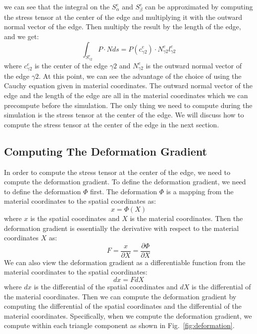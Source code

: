 \documentclass[acmtog]{acmart}
\begin{document}
we can see that the integral on the $S_{\alpha}^e$ and $S_{\beta}^e$ can be approximated by computing the stress tensor at the center of the edge and multiplying it with the outward normal vector of the edge. Then multiply the result by the length of the edge, and we get:
\begin{equation*}
  \int_{S_{\gamma2}^e} P \cdot N ds = P(c_{\gamma2}^e) \cdot N_{\gamma2}^e l_{\gamma2}^e
\end{equation*}
where $c_{\gamma2}^e$ is the center of the edge $\gamma2$ and $N_{\gamma2}^e$ is the outward normal vector of the edge $\gamma2$. At this point, we can see the advantage of the choice of using the Cauchy equation given in material coordinates. The outward normal vector of the edge and the length of the edge are all in the material coordinates which we can precompute before the simulation. The only thing we need to compute during the simulation is the stress tensor at the center of the edge. We will discuss how to compute the stress tensor at the center of the edge in the next section. 

\subsection{Computing The Deformation Gradient}
In order to compute the stress tensor at the center of the edge, we need to compute the deformation gradient. To define the deformation gradient, we need to define the deformation $\Phi$ first. The deformation $\Phi$ is a mapping from the material coordinates to the spatial coordinates as:
\begin{equation*}
  x = \Phi(X)
\end{equation*}
where $x$ is the spatial coordinates and $X$ is the material coordinates. Then the deformation gradient is essentially the derivative with respect to the material coordinates $X$ as:
\begin{equation*}
  F = \frac{x}{\partial X}=\frac{\partial \Phi}{\partial X}
\end{equation*}
We can also view the deformation gradient as a differentiable function from the material coordinates to the spatial coordinates: 
\begin{equation*}
  dx = F dX
\end{equation*}
where $dx$ is the differential of the spatial coordinates and $dX$ is the differential of the material coordinates. Then we can compute the deformation gradient by computing the differential of the spatial coordinates and the differential of the material coordinates. Specifically, when we compute the deformation gradient, we compute within each triangle component as shown in Fig.~\ref{fig:deformation}. 
\end{document}
